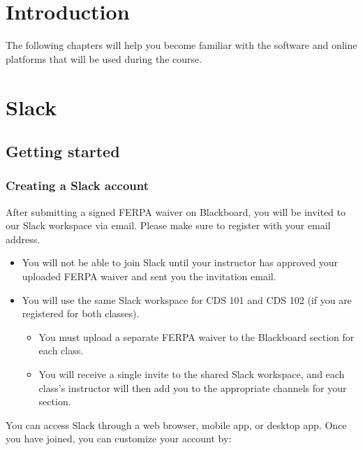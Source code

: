 \documentclass[
]{book}
\providecommand{\tightlist}{%
  \setlength{\itemsep}{0pt}\setlength{\parskip}{0pt}}
\begin{document}
\hypertarget{toolbox-introduction}{%
\chapter{Introduction}\label{toolbox-introduction}}

The following chapters will help you become familiar with the software and online platforms that will be used during the course.

\hypertarget{slack}{%
\chapter{Slack}\label{slack}}

\hypertarget{getting-started}{%
\section{Getting started}\label{getting-started}}

\hypertarget{creating-a-slack-account}{%
\subsection{Creating a Slack account}\label{creating-a-slack-account}}

After submitting a signed FERPA waiver on Blackboard, you will be invited to our Slack workspace via email. Please make sure to register with your \emph{\citet{masonlive.gmu.edu}} email address.

\begin{itemize}
\tightlist
\item
  You will not be able to join Slack until your instructor has approved your uploaded FERPA waiver and sent you the invitation email.
\item
  You will use the same Slack workspace for CDS 101 and CDS 102 (if you are registered for both classes).

  \begin{itemize}
  \tightlist
  \item
    You must upload a separate FERPA waiver to the Blackboard section for each class.
  \item
    You will receive a single invite to the shared Slack workspace, and each class's instructor will then add you to the appropriate channels for your section.
  \end{itemize}
\end{itemize}

You can access Slack through a web browser, mobile app, or desktop app. Once you have joined, you can customize your account by:
\end{document}
